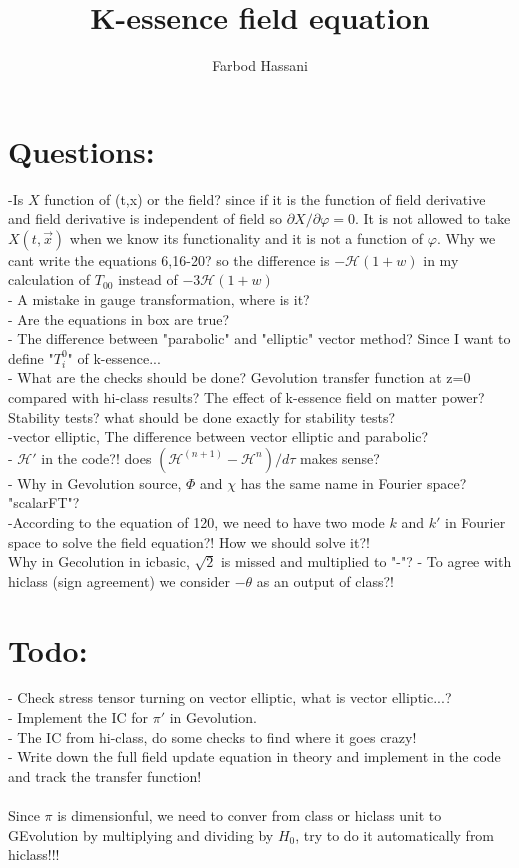 \documentclass[a4paper,14pt]{article}
\title{\color{BlueViolet}\Huge{K-essence field equation}}
\author{Farbod Hassani}
\begin{document}
  \maketitle
  \tableofcontents

  \flushbottom
  \section{Questions:}
    -Is $X$ function of (t,x) or the field? since if it is the function of field derivative and field derivative is independent of field so $\partial X/\partial \varphi=0$. It is not allowed to take $X (t,\vec{x})$ when we know its functionality and it is not a function of $\varphi$. Why we cant write the equations 6,16-20? so the difference is   $- \mathcal{H} (1+w) $ in my calculation of $T_{00}$ instead of $-3 \mathcal{H}(1+w)$\\
  - A mistake in gauge transformation, where is it? \\
  - Are the equations in box are true?\\
  - The difference between "parabolic" and "elliptic" vector method? Since  I want to define "$T_i^0$" of k-essence... \\
  - What are the checks should be done? Gevolution transfer function at z=0 compared with hi-class results? The effect of k-essence field on matter power? Stability tests? what should be done exactly for stability tests? \\
   -vector elliptic, The difference between vector elliptic and parabolic?\\
  - $\mathcal{H}'$  in the code?! does $(\mathcal{H}^{(n+1)}-\mathcal{H}^{n})/d\tau$ makes sense? \\
 - Why in Gevolution source, $\Phi$ and $\chi$ has the same name in Fourier space? "scalarFT"? \\
 -According to the equation of 120, we need to have two mode $k$ and $k'$ in Fourier space to solve the field equation?! How we should solve it?! \\
 Why in Gecolution in icbasic, $\sqrt{2}$ is missed and multiplied to "-"?
 - To agree with hiclass (sign agreement) we consider $-\theta$ as an output of class?!
 
  \section{Todo:}
  - Check stress tensor turning on vector elliptic, what is vector elliptic...? \\
  - Implement the IC for $\pi'$ in Gevolution. \\
  - The IC from hi-class, do some checks to find where it goes crazy! \\
  - Write down the full field update equation in theory and implement in the code and track the transfer function!\\
  {}\\
Since $\pi$ is dimensionful, we need to conver from class or hiclass unit to GEvolution by multiplying and dividing by $H_0$, try to do it automatically from hiclass!!!
\end{document}
